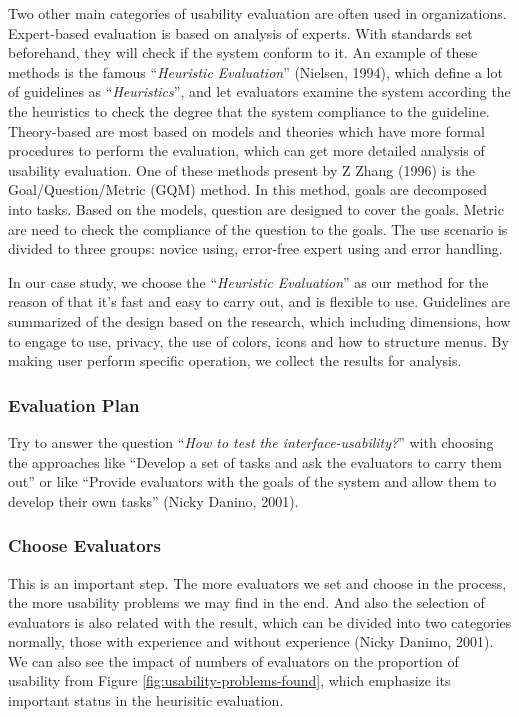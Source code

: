 \documentclass[twocolumn]{article}
\begin{document}
Two other main categories of usability evaluation are often used in organizations. Expert-based evaluation is based on analysis of experts. With standards set beforehand, they will check if the system conform to it. An example of these methods is the famous “\emph{Heuristic Evaluation}” (Nielsen, 1994), which define a lot of guidelines as “\emph{Heuristics}”, and let evaluators examine the system according the the heuristics to check the degree that the system compliance to the guideline. Theory-based are most based on models and theories which have more formal procedures to perform the evaluation, which can get more detailed analysis of usability evaluation. One of these methods present by Z Zhang (1996) is the Goal/Question/Metric (GQM) method. In this method, goals are decomposed into tasks. Based on the models, question are designed to cover the goals. Metric are need to check the compliance of the question to the goals. The use scenario is divided to three groups: novice using, error-free expert using and error handling.

In our case study, we choose the “\emph{Heuristic Evaluation}” as our method for the reason of that it’s fast and easy to carry out, and is flexible to use. Guidelines are summarized of the design based on the research, which including dimensions, how to engage to use, privacy, the use of colors, icons and how to structure menus. By making user perform specific operation, we collect the results for analysis.

\subsubsection{Evaluation Plan}
Try to answer the question “\emph{How to test the interface-usability?}”  with choosing the approaches like “Develop a set of tasks and ask the evaluators to carry them out” or like “Provide evaluators with the goals of the system and allow them to develop their own tasks” (Nicky Danino, 2001).

\subsubsection{Choose Evaluators}
This is an important step. The more evaluators we set and choose in the process, the more usability problems we may find in the end. And also the selection of evaluators is also related with the result, which can be divided into two categories normally, those with experience and without experience (Nicky Danimo, 2001). We can also see the impact of numbers of evaluators on the proportion of usability from Figure \ref{fig:usability-problems-found}, which emphasize its important status in the heurisitic evaluation.
\end{document}
